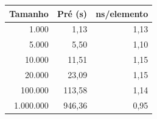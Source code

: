 \begin{tabular}{rrr}
\hline
\textbf{Tamanho} & \textbf{Pré (\textmu{}s)} & \textbf{ns/elemento} \\
\hline
1.000 & 1,13 & 1,13 \\
5.000 & 5,50 & 1,10 \\
10.000 & 11,51 & 1,15 \\
20.000 & 23,09 & 1,15 \\
100.000 & 113,58 & 1,14 \\
1.000.000 & 946,36 & 0,95 \\
\hline
\end{tabular}
